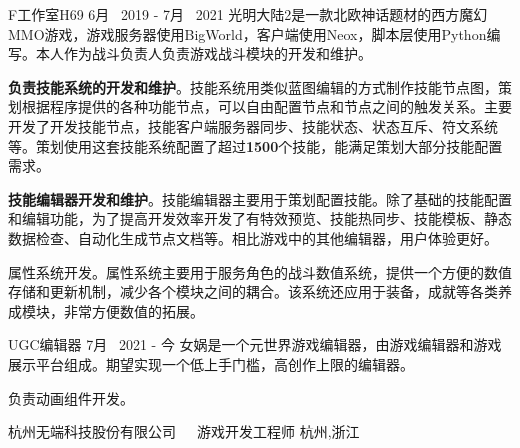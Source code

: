 \begin{cventries}
\cventryproject
{F工作室H69} %
{6月~ 2019 - 7月~ 2021} %
{光明大陆2是一款北欧神话题材的西方魔幻MMO游戏，游戏服务器使用BigWorld，客户端使用Neox，脚本层使用Python编写。本人作为战斗负责人负责游戏战斗模块的开发和维护。}
{ %
	\begin{cvitems}
		\item {\textbf{负责技能系统的开发和维护}。技能系统用类似蓝图编辑的方式制作技能节点图，策划根据程序提供的各种功能节点，可以自由配置节点和节点之间的触发关系。主要开发了开发技能节点，技能客户端服务器同步、技能状态、状态互斥、符文系统等。策划使用这套技能系统配置了超过\textbf{1500}个技能，能满足策划大部分技能配置需求。}
		\item{\textbf{技能编辑器开发和维护}。技能编辑器主要用于策划配置技能。除了基础的技能配置和编辑功能，为了提高开发效率开发了有特效预览、技能热同步、技能模板、静态数据检查、自动化生成节点文档等。相比游戏中的其他编辑器，用户体验更好。}
		\item{属性系统开发。属性系统主要用于服务角色的战斗数值系统，提供一个方便的数值存储和更新机制，减少各个模块之间的耦合。该系统还应用于装备，成就等各类养成模块，非常方便数值的拓展。}
	\end{cvitems}
}

\cventryproject
{UGC编辑器} %
{7月~ 2021 - 今} %
{女娲是一个元世界游戏编辑器，由游戏编辑器和游戏展示平台组成。期望实现一个低上手门槛，高创作上限的编辑器。}
{ %
	\begin{cvitems}
		\item {负责动画组件开发。}
	\end{cvitems}
}


\cventrycompany
{杭州无端科技股份有限公司~~~游戏开发工程师} %
{杭州,浙江} %


\end{cventries}
